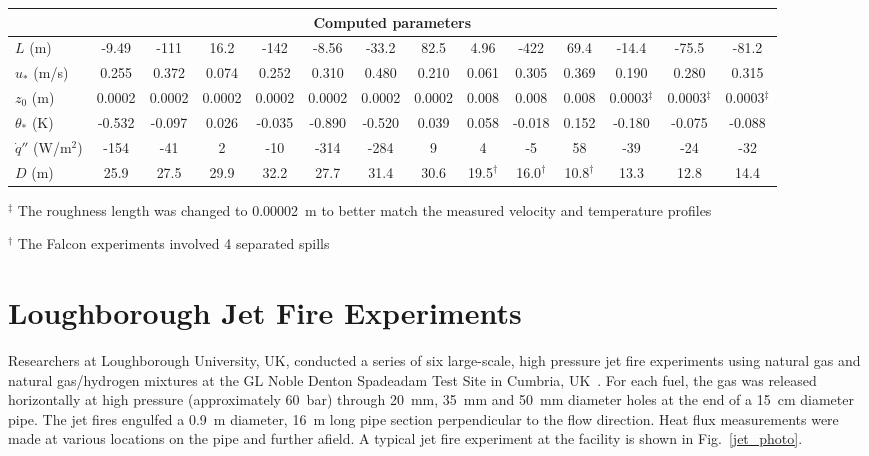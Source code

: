 \begin{table}
\begin{tabular}{|l|c|c|c|c|c|c|c|c|c|c|c|c|c|}
\multicolumn{14}{|c|}{Computed parameters} \\ \hline
$L$ (m)                        & -9.49  & -111   & 16.2   & -142   & -8.56  & -33.2  & 82.5        & 4.96        & -422        & 69.4              & -14.4           & -75.5          & -81.2   \\ \hline
$u_*$ (m/s)                    & 0.255  & 0.372  & 0.074  & 0.252  & 0.310  & 0.480  & 0.210       & 0.061       & 0.305       & 0.369             & 0.190           & 0.280          & 0.315   \\ \hline
$z_0$ (m)                      & 0.0002 & 0.0002 & 0.0002 & 0.0002 & 0.0002 & 0.0002 & 0.0002      & 0.008       & 0.008       & 0.008             & 0.0003$^\ddag$  & 0.0003$^\ddag$ & 0.0003$^\ddag$  \\ \hline
$\theta_*$ (K)                 & -0.532 & -0.097 & 0.026  & -0.035 & -0.890 & -0.520 & 0.039       & 0.058       & -0.018      & 0.152             & -0.180          & -0.075         & -0.088  \\ \hline
$\dot{q}''$ (W/m$^2$)          & -154   & -41    & 2      & -10    & -314   & -284   & 9           & 4           & -5          & 58                & -39             & -24            & -32     \\ \hline
$D$ (m)                        & 25.9   & 27.5   & 29.9   & 32.2   & 27.7   & 31.4   & 30.6        & 19.5$^\dag$ & 16.0$^\dag$ & 10.8$^\dag$       & 13.3            & 12.8           & 14.4    \\ \hline
\end{tabular}
$^\ddag$ The roughness length was changed to 0.00002~m to better match the measured velocity and temperature profiles

$^\dag$ The Falcon experiments involved 4 separated spills
\label{tab:LNG_Dispersion}
\end{table}



\section{Loughborough Jet Fire Experiments}
\label{Loughborough_Jet_Fires_Description}

Researchers at Loughborough University, UK, conducted a series of six large-scale, high pressure jet fire experiments using natural gas and natural gas/hydrogen mixtures at the GL Noble Denton Spadeadam Test Site in Cumbria, UK~\cite{Lowesmith:PSEP2012}. For each fuel, the gas was released horizontally at high pressure (approximately 60~bar) through 20~mm, 35~mm and 50~mm diameter holes at the end of a 15~cm diameter pipe. The jet fires engulfed a 0.9~m diameter, 16~m long pipe section perpendicular to the flow direction. Heat flux measurements were made at various locations on the pipe and further afield. A typical jet fire experiment at the facility is shown in Fig.~\ref{jet_photo}.

